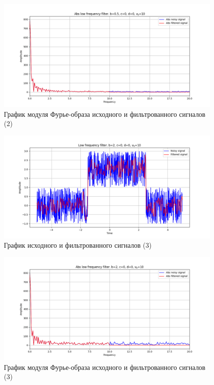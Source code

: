 \documentclass[a4paper, 12pt]{article}
\begin{document}
    \begin{figure}[H]
        \centering
        \includegraphics[scale=0.48]{2_abs_nohigh.png}
        \captionsetup{skip=0pt}
        \caption{График модуля Фурье-образа исходного и фильтрованного сигналов (2)}
        \label{fig:fig4}
    \end{figure}
    \begin{figure}[H]
        \centering
        \includegraphics[scale=0.48]{3_nohigh.png}
        \captionsetup{skip=0pt}
        \caption{График исходного и фильтрованного сигналов (3)}
        \label{fig:fig5}
    \end{figure}
    \begin{figure}[H]
        \centering
        \includegraphics[scale=0.48]{3_abs_nohigh.png}
        \captionsetup{skip=0pt}
        \caption{График модуля Фурье-образа исходного и фильтрованного сигналов (3)}
        \label{fig:fig6}
    \end{figure}
\end{document}
